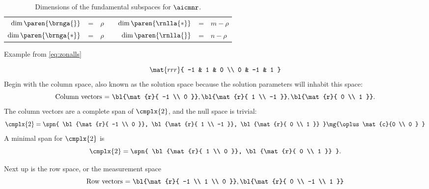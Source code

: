   \begin{table}[htbp]  %
    \caption{Dimensions of the fundamental subspaces for $\aicmnr$.}
    \begin{center}
      \begin{tabular}{rclcrcl}
        $\dim \paren{\brnga{}}$ & = & $\rho$ && $\dim \paren{\rnlla{*}}$ & = & $m - \rho$ \\
        $\dim \paren{\brnga{*}}$ & = & $\rho$ && $\dim \paren{\rnlla{}}$ & = & $n - \rho$ 
      \end{tabular}
    \end{center}
  \end{table}%

Example from \eqref{eq:zonalls}

  \begin{equation*}   %
    \mat{rrr}{ 
      -1 & 1 & 0 \\
       0 & -1 & 1 }
  \end{equation*}
Begin with the column space, also known as the solution space because the solution parameters will inhabit this space:
  \begin{equation*}   %
      \text{Column vectors = } \bl{\mat{r}{ -1 \\ 0 }}, \bl{\mat{r}{ 1 \\ -1 }}, \bl{\mat{r}{ 0 \\ 1 }} .
  \end{equation*}
The column vectors are a complete span of $\cmplx{2}$, and the null space is trivial:
  \begin{equation*}   %
      \cmplx{2} = \spn { \bl{\mat{r}{ -1 \\ 0 }}, \bl{\mat{r}{ 1 \\ -1 }}, \bl{\mat{r}{ 0 \\ 1 }} } \mg{\oplus \mat{c}{0 \\ 0 } }
  \end{equation*}
A minimal span for $\cmplx{2}$ is
  \begin{equation*}   %
      \cmplx{2} = \spn { \bl{\mat{r}{ 1 \\ 0 }}, \bl{\mat{r}{ 0 \\ 1 }} }.
  \end{equation*}

Next up is the row space, or the measurement space
  \begin{equation*}   %
      \text{Row vectors = } \bl{\mat{r}{ -1 \\ 1 \\ 0 }}, \bl{\mat{r}{ 0  \\ -1 \\ 1 }}
  \end{equation*}

